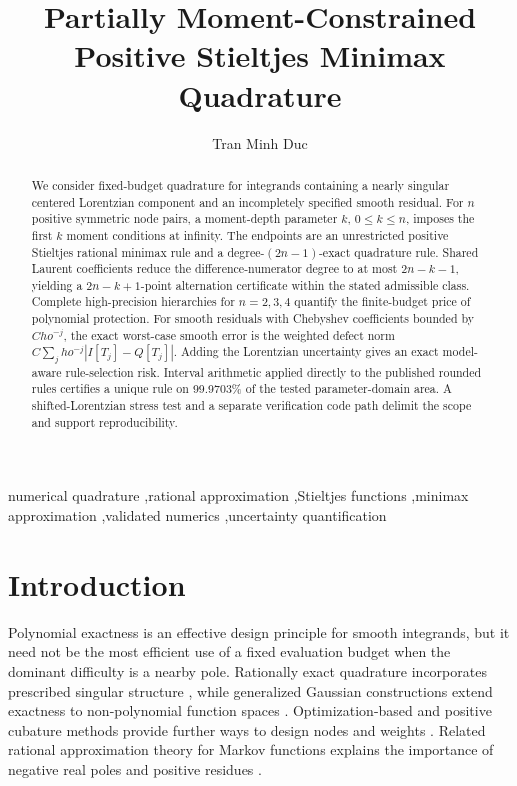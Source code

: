\documentclass[preprint,12pt]{elsarticle}
\theoremstyle{remark}
\begin{document}
\begin{frontmatter}

\title{Partially Moment-Constrained Positive Stieltjes Minimax Quadrature}

\author[inst1]{Tran Minh Duc}


\begin{abstract}
We consider fixed-budget quadrature for integrands containing a
nearly singular centered Lorentzian component and an incompletely
specified smooth residual. For \(n\) positive symmetric node pairs, a
moment-depth parameter \(k\), \(0\leq k\leq n\), imposes the first
\(k\) moment conditions at infinity. The endpoints are an unrestricted
positive Stieltjes rational minimax rule and a degree-\((2n-1)\)-exact
quadrature rule. Shared Laurent coefficients reduce the
difference-numerator degree to at most \(2n-k-1\), yielding a
\(2n-k+1\)-point alternation certificate within the stated admissible
class. Complete high-precision hierarchies for \(n=2,3,4\) quantify the
finite-budget price of polynomial protection. For smooth residuals with
Chebyshev coefficients bounded by \(C
ho^{-j}\), the exact worst-case
smooth error is the weighted defect norm
\(C\sum_j
ho^{-j}|I[T_j]-Q[T_j]|\). Adding the Lorentzian uncertainty
gives an exact model-aware rule-selection risk. Interval arithmetic
applied directly to the published rounded rules certifies a unique rule
on 99.9703\% of the tested parameter-domain area. A
shifted-Lorentzian stress test and a separate verification code path
delimit the scope and support reproducibility.
\end{abstract}

\begin{keyword}
numerical quadrature \sep rational approximation \sep Stieltjes functions
\sep minimax approximation \sep validated numerics
\sep uncertainty quantification
\end{keyword}

\end{frontmatter}

\section{Introduction}

Polynomial exactness is an effective design principle for smooth
integrands, but it need not be the most efficient use of a fixed
evaluation budget when the dominant difficulty is a nearby pole.
Rationally exact quadrature incorporates prescribed singular structure
\cite{gautschi1993}, while generalized Gaussian constructions extend
exactness to non-polynomial function spaces \cite{huybrechs2017}.
Optimization-based and positive cubature methods provide further ways
to design nodes and weights \cite{keshavarzzadeh2018,glaubitz2020}.
Related rational approximation theory for Markov functions explains the
importance of negative real poles and positive residues
\cite{beckermann2021}.
\end{document}
